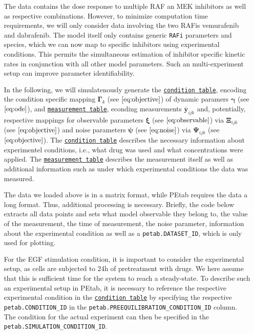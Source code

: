 \documentclass[11pt]{article}
\begin{document}
    The data contains the dose response to multiple RAF an MEK inhibitors as
well as respective combinations. However, to minimize computation time
requirements, we will only consider data involving the two RAFis
vemurafenib and dabrafenib. The model itself only contains generic
\texttt{RAFi} parameters and species, which we can now map to specific
inhibitors using experimental conditions. This permits the simultaneous
estimation of inhibitor specific kinetic rates in conjunction with all
other model parameters. Such an multi-experiment setup can improve
parameter identifiability.

In the following, we will simulatenously generate the
\href{https://petab.readthedocs.io/en/latest/documentation_data_format.html\#condition-table}{\texttt{condition\ table}},
encoding the condition specific mapping \(\boldsymbol{\Gamma}_k\) (see
\(\eqref{eq:objective}\)) of dynamic paramers \(\boldsymbol{\gamma}\)
(see \(\eqref{eq:ode}\)), and
\href{https://petab.readthedocs.io/en/latest/documentation_data_format.html\#measurement-table}{\texttt{measurement\ table}},
econding measurements \(\bar{\textbf{y}} _{ijk}\) and, potentially,
respective mappings for observable parameters \(\boldsymbol{\xi}\) (see
\(\eqref{eq:observable}\)) via \(\boldsymbol{\Xi}_{ijk}\) (see
\(\eqref{eq:objective}\)) and noise parameters \(\boldsymbol{\psi}\)
(see \(\eqref{eq:noise}\)) via \(\boldsymbol{\Psi}_{ijk}\) (see
\(\eqref{eq:objective}\)). The
\href{https://petab.readthedocs.io/en/latest/documentation_data_format.html\#condition-table}{\texttt{condition\ table}}
describes the necessary information about experimentel conditions, i.e.,
what drug was used and what concentrations were applied. The
\href{https://petab.readthedocs.io/en/latest/documentation_data_format.html\#measurement-table}{\texttt{measurement\ table}}
describes the measurement itself as well as additional information such
as under which experimental conditions the data was measured.

The data we loaded above is in a matrix format, while PEtab requires the
data a long format. Thus, additional processing is necessary. Briefly,
the code below extracts all data points and sets what model observable
they belong to, the value of the measurement, the time of measurement,
the noise parameter, information about the experimental condition as
well as a \texttt{petab.DATASET\_ID}, which is only used for plotting.

For the EGF stimulation condition, it is important to consider the
experimental setup, as cells are subjected to 24h of pretreatment with
drugs. We here assume that this is sufficient time for the system to
reach a steady-state. To describe such an experimental setup in PEtab,
it is necessary to reference the respective experimental condition in
the
\href{https://petab.readthedocs.io/en/latest/documentation_data_format.html\#condition-table}{\texttt{condition\ table}}
by specifying the respective \texttt{petab.CONDITION\_ID} in the
\texttt{petab.PREEQUILIBRATION\_CONDITION\_ID} column. The condition for
the actual experiment can then be specified in the
\texttt{petab.SIMULATION\_CONDITION\_ID}.
\end{document}
